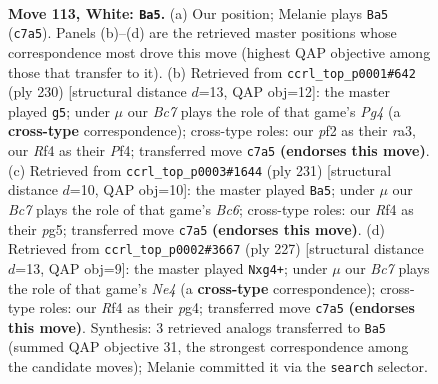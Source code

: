 \documentclass[11pt]{article}
\begin{document}
\clearpage

\begin{figure}[p]\centering
\begin{subfigure}{0.46\textwidth}\centering
\resizebox{\linewidth}{!}{%
\newchessgame
\chessboard[
  setfen={7k/2B1r3/8/7P/5R2/8/K4p2/8 w - - 4 113},
  showmover=false,
  pgfstyle=straightmove, color=movearrow, markmove={c7-a5}
]}
\caption{}
\end{subfigure}\hfill
\begin{subfigure}{0.46\textwidth}\centering
\resizebox{\linewidth}{!}{%
\newchessgame
\chessboard[
  setfen={8/6k1/2R5/7p/5PP1/r7/5K2/8 w - - 2 116},
  showmover=false,
  pgfstyle=straightmove, color=movearrow, markmove={g4-g5}
]}
\caption{}
\end{subfigure}
\\[4pt]
\begin{subfigure}{0.46\textwidth}\centering
\resizebox{\linewidth}{!}{%
\newchessgame
\chessboard[
  setfen={8/3k1p2/8/6P1/4K3/1Rb5/8/8 b - - 86 116},
  showmover=false,
  pgfstyle=straightmove, color=movearrow, markmove={c3-a5}
]}
\caption{}
\end{subfigure}\hfill
\begin{subfigure}{0.46\textwidth}\centering
\resizebox{\linewidth}{!}{%
\newchessgame
\chessboard[
  setfen={8/7k/8/R3n1p1/6P1/8/5K2/8 b - - 86 114},
  showmover=false,
  pgfstyle=straightmove, color=movearrow, markmove={e5-g4}
]}
\caption{}
\end{subfigure}
\caption{\textbf{Move 113, White: \texttt{Ba5}.} (a) Our position; Melanie plays \texttt{Ba5} (\texttt{c7a5}). Panels (b)--(d) are the retrieved master positions whose correspondence most drove this move (highest QAP objective among those that transfer to it). (b) Retrieved from \texttt{ccrl\_top\_p0001\#642} (ply 230) [structural distance $d$=13, QAP obj=12]: the master played \texttt{g5}; under $\mu$ our \emph{Bc7} plays the role of that game's \emph{Pg4} (a \textbf{cross-type} correspondence); cross-type roles: our \emph{p}f2 as their \emph{r}a3, our \emph{R}f4 as their \emph{P}f4; transferred move \texttt{c7a5} \textbf{(endorses this move)}. (c) Retrieved from \texttt{ccrl\_top\_p0003\#1644} (ply 231) [structural distance $d$=10, QAP obj=10]: the master played \texttt{Ba5}; under $\mu$ our \emph{Bc7} plays the role of that game's \emph{Bc6}; cross-type roles: our \emph{R}f4 as their \emph{p}g5; transferred move \texttt{c7a5} \textbf{(endorses this move)}. (d) Retrieved from \texttt{ccrl\_top\_p0002\#3667} (ply 227) [structural distance $d$=13, QAP obj=9]: the master played \texttt{Nxg4+}; under $\mu$ our \emph{Bc7} plays the role of that game's \emph{Ne4} (a \textbf{cross-type} correspondence); cross-type roles: our \emph{R}f4 as their \emph{p}g4; transferred move \texttt{c7a5} \textbf{(endorses this move)}. Synthesis: 3 retrieved analogs transferred to \texttt{Ba5} (summed QAP objective 31, the strongest correspondence among the candidate moves); Melanie committed it via the \texttt{search} selector.}
\label{fig:thought-m224}
\end{figure}
\end{document}
